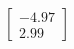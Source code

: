\documentclass[preview]{standalone}
\begin{document}
\begin{align*}
\begin{bmatrix} -4.97 \\ 2.99 \end{bmatrix}
\end{align*}
\end{document}
